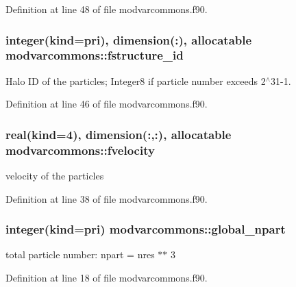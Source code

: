 Definition at line 48 of file modvarcommons.\-f90.

\hypertarget{classmodvarcommons_aa3e7819da325f4559abff9dc0359d05d}{
\subsubsection[{fstructure\-\_\-id}]{\setlength{\rightskip}{0pt plus 5cm}integer(kind=pri), dimension(\-:), allocatable modvarcommons\-::fstructure\-\_\-id}}\label{classmodvarcommons_aa3e7819da325f4559abff9dc0359d05d}


Halo I\-D of the particles; Integer8 if particle number exceeds 2$^\wedge$31-\/1. 



Definition at line 46 of file modvarcommons.\-f90.

\hypertarget{classmodvarcommons_a5c548d805cdaa0c237b5cdd58247b207}{
\subsubsection[{fvelocity}]{\setlength{\rightskip}{0pt plus 5cm}real(kind=4), dimension(\-:,\-:), allocatable modvarcommons\-::fvelocity}}\label{classmodvarcommons_a5c548d805cdaa0c237b5cdd58247b207}


velocity of the particles 



Definition at line 38 of file modvarcommons.\-f90.

\hypertarget{classmodvarcommons_a76303173f75dcfe82023dfe19fc22fbb}{
\subsubsection[{global\-\_\-npart}]{\setlength{\rightskip}{0pt plus 5cm}integer(kind=pri) modvarcommons\-::global\-\_\-npart}}\label{classmodvarcommons_a76303173f75dcfe82023dfe19fc22fbb}


total particle number\-: npart = nres $\ast$$\ast$ 3 



Definition at line 18 of file modvarcommons.\-f90.

